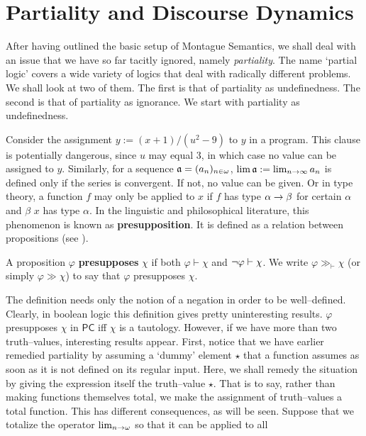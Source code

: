 \section{Partiality and Discourse Dynamics}
\label{kap4x7}
%
%
%
After having outlined the basic setup of Montague Semantics, we
shall deal with an issue that we have so far tacitly ignored, namely
{\it partiality}. The name `partial logic' covers a wide variety of 
logics that deal with radically different problems. We shall look at 
two of them. The first is that of partiality as undefinedness. The
second is that of partiality as ignorance. We start with
partiality as undefinedness.

Consider the assignment $y := (x+1)/(u^2 - 9)$ to $y$ in a program.
This clause is potentially dangerous, since $u$ may equal 3, in
which case no value can be assigned to $y$. Similarly, for a sequence
$\mathfrak{a} = (a_n)_{n \in \omega}$, $\lim \mathfrak{a} := \lim_{n \rightarrow \infty} a_n$
is defined only if the series is convergent. If not, no value can be
given. Or in type theory, a function $f$ may only be applied to $x$ if
$f$ has type $\alpha\rightarrow\beta$ for certain $\alpha$ and $\beta$ $x$ has
type $\alpha$. In the linguistic and philosophical literature, this
phenomenon is known as \textbf{presupposition}. It is defined as a 
relation between propositions (see \cite{vandersandt:presupposition}).
\begin{defn}
\index{$\gg_{\vdash}$}%
A proposition $\varphi$ \textbf{presupposes} $\chi$ if both
$\varphi \vdash \chi$ and $\neg\varphi \vdash \chi$.
We write $\varphi \gg_{\vdash} \chi$ (or simply $\varphi \gg
\chi$) to say that $\varphi$ presupposes $\chi$.
\end{defn}
The definition needs only the notion of a negation in order to be
well--defined. Clearly, in boolean logic this definition gives
pretty uninteresting results. $\varphi$ presupposes $\chi$ in 
$\mathsf{PC}$ iff $\chi$ is a tautology. However, if we have more
than two truth--values, interesting results appear. First, notice
that we have earlier remedied partiality by assuming a `dummy'
element $\star$ that a function assumes as soon as it is not
defined on its regular input. Here, we shall remedy the situation
by giving the expression itself the truth--value $\star$. That is
to say, rather than making functions themselves total, we make the
assignment of truth--values a total function. This has different
consequences, as will be seen. Suppose that we totalize the
operator $\lim_{n \rightarrow \omega}$ so that it can be applied to all
